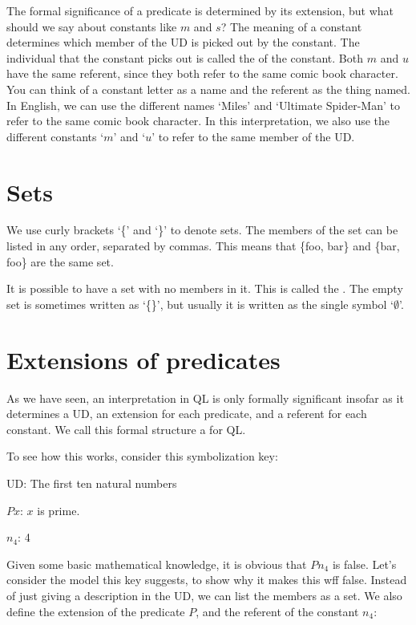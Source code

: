 The formal significance of a predicate is determined by its extension, but what should we say about constants like $m$ and $s$? The meaning of a constant determines which member of the UD is picked out by the constant. The individual that the constant picks out is called the  of the constant. Both $m$ and $u$ have the same referent, since they both refer to the same comic book character. You can think of a constant letter as a name and the referent as the thing named. In English, we can use the different names `Miles' and `Ultimate Spider-Man' to refer to the same comic book character. In this interpretation, we also use the different constants `$m$' and `$u$' to refer to the same member of the UD.

\section{Sets}

We use curly brackets `\{' and `\}' to denote sets. The members of the set can be listed in any order, separated by commas. This means that \{foo, bar\} and \{bar, foo\} are the same set.

It is possible to have a set with no members in it. This is called the . The empty set is sometimes written as `\{\}', but usually it is written as the single symbol `$\emptyset$'.

\section{Extensions of predicates}
As we have seen, an interpretation in QL is only formally significant insofar as it determines a UD, an extension for each predicate, and a referent for each constant. We call this formal structure a  for QL.

To see how this works, consider this symbolization key:
\begin{ekey}
\item{UD:} The first ten natural numbers
\item{$Px$:} $x$ is prime.
\item{$n_{4}$}: 4
\end{ekey}

Given some basic mathematical knowledge, it is obvious that $Pn_{4}$ is false. Let's consider the model this key suggests, to show why it makes this wff false. Instead of just giving a description in the UD, we can list the members as a set. We also define the extension of the predicate $P$, and the referent of the constant $n_{4}$:

